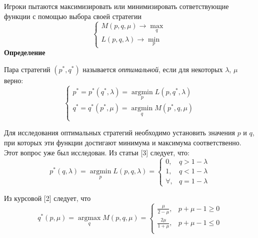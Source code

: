\documentclass[letterpaper,12pt, reqno]{article}
\DeclareMathOperator*{\argmax}{argmax} %
\DeclareMathOperator*{\argmin}{argmin} %
\begin{document}
\begin{flushleft}
Игроки пытаются максимизировать или минимизировать сответствующие функции с помощью выбора своей стратегии
\[
\begin{cases} M(p,q,\mu)\rightarrow\max\limits_{q} \\
L(p,q,\lambda)\rightarrow\min\limits_{p}\end{cases}
\]
\textbf{Определение}

Пара стратегий $(p^{*}, q^{*})$ называется \textit{оптимальной}, если для некоторых $\lambda$, $\mu$ верно:
\begin{equation}
\begin{cases} 
p^{*}=p^{*}(q^{*}, \lambda) = \argmin\limits_{p} L(p, q^{*}, \lambda) \\ 
q^{*}=q^{*}(p^{*}, \mu) = \argmin\limits_{q} M(p^{*}, q, \mu) \\
\end{cases}
\end{equation}
\vspace{5mm}

Для исследования оптимальных стратегий необходимо установить значения $p$ и $q$, при которых
эти функции достигают минимума и максимума соответственно. Этот вопрос уже был исследован. Из статьи [3] следует, что:
\begin{equation}
p^{*}(q, \lambda)=\argmin\limits_{p}L(p,q,\lambda)=\begin{cases}0,& q>1-\lambda \\
1,& q<1-\lambda \\
\forall,& q=1-\lambda\end{cases}
\end{equation}

Из курсовой [2] следует, что
\begin{equation}
q^{*}(p, \mu)=\argmax\limits_{q}M(p,q,\mu)=
\begin{cases}
\frac{\mu}{2-\mu},& p+\mu-1\geq 0 \\
\frac{2\mu}{1+\mu},& p+\mu-1\leq 0 \\
\end{cases}
\end{equation}




\end{flushleft}
\end{document}
